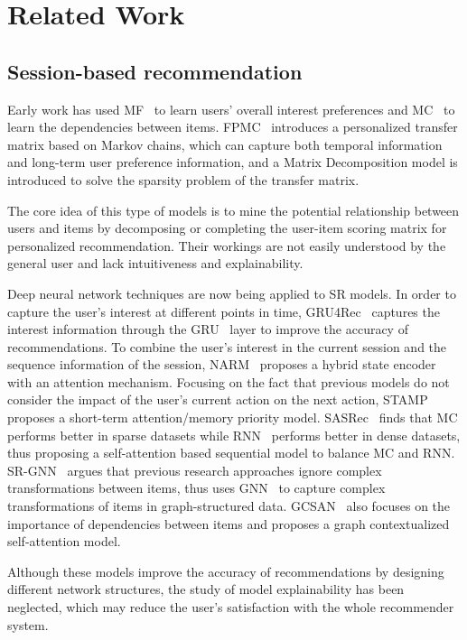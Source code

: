 \documentclass[10pt,journal,compsoc]{IEEEtran}
\begin{document}
\section{Related Work}
\subsection{Session-based recommendation}
Early work has used MF~\cite{rs_mf} to learn users' overall interest preferences and MC~\cite{rs_mc} to learn the dependencies between items. FPMC~\cite{rs_fpmc} introduces a personalized transfer matrix based on Markov chains, which can capture both temporal information and long-term user preference information, and a Matrix Decomposition model is introduced to solve the sparsity problem of the transfer matrix.

The core idea of this type of models is to mine the potential relationship between users and items by decomposing or completing the user-item scoring matrix for personalized recommendation. Their workings are not easily understood by the general user and lack intuitiveness and explainability.

Deep neural network techniques are now being applied to SR models. In order to capture the user's interest at different points in time, GRU4Rec~\cite{rs_gru4rec} captures the interest information through the GRU~\cite{GRU} layer to improve the accuracy of recommendations.
To combine the user's interest in the current session and the sequence information of the session, NARM~\cite{rs_narm} proposes a hybrid state encoder with an attention mechanism.
Focusing on the fact that previous models do not consider the impact of the user's current action on the next action, STAMP~\cite{rs_stamp} proposes a short-term attention/memory priority model.
SASRec~\cite{rs_sasrec} finds that MC performs better in sparse datasets while RNN~\cite{RNN} performs better in dense datasets, thus proposing a self-attention based sequential model to balance MC and RNN.
SR-GNN~\cite{rs_srgnn} argues that previous research approaches ignore complex transformations between items, thus uses GNN~\cite{GNN} to capture complex transformations of items in graph-structured data. 
GCSAN~\cite{rs_gcsan} also focuses on the importance of dependencies between items and proposes a graph contextualized self-attention model.

Although these models improve the accuracy of recommendations by designing different network structures, the study of model explainability has been neglected, which may reduce the user's satisfaction with the whole recommender system.
\end{document}
